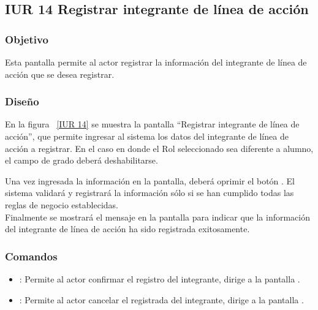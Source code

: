 \subsection{IUR 14 Registrar integrante de línea de acción}

\subsubsection{Objetivo}
	
    Esta pantalla permite al actor  registrar la información del integrante de línea de acción que se desea registrar.

\subsubsection{Diseño}

    En la figura ~\ref{IUR 14} se muestra la pantalla ``Registrar integrante de línea de acción'', que permite ingresar al sistema los datos del integrante de línea de acción a registrar. En el caso en donde el Rol seleccionado sea diferente a alumno, el campo de grado deberá deshabilitarse.
    
    Una vez ingresada la información en la pantalla, deberá oprimir el botón .
    El sistema validará y registrará la información sólo si se han cumplido todas las reglas de negocio establecidas.  \\
    
    Finalmente se mostrará el mensaje  en 
    la pantalla  para indicar que la información del integrante de línea de acción ha sido registrada exitosamente.
    

     
\subsubsection{Comandos}
    \begin{itemize}
	\item {}: Permite al actor confirmar el registro del integrante, dirige a la pantalla .
	\item {}: Permite al actor cancelar el registrada del integrante, dirige a la pantalla .
    \end{itemize}

